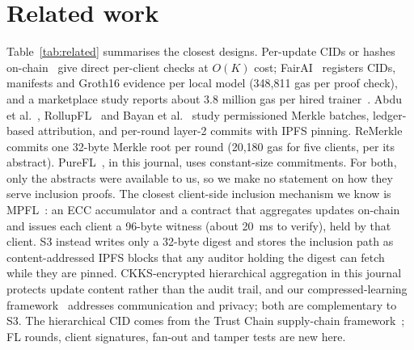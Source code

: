\documentclass[final,3p,times,twocolumn]{elsarticle}
\begin{document}
\section{Related work}\label{sec:related}
Table~\ref{tab:related} summarises the closest designs. Per-update CIDs or hashes on-chain~\cite{rauthan,khor} give direct per-client checks at $O(K)$ cost; FairAI~\cite{fairai} registers CIDs, manifests and Groth16 evidence per local model (348,811 gas per proof check), and a marketplace study reports about 3.8 million gas per hired trainer~\cite{mantegazine}. Abdu et al.~\cite{abdu}, RollupFL~\cite{rollupfl} and Bayan et al.~\cite{bayan} study permissioned Merkle batches, ledger-based attribution, and per-round layer-2 commits with IPFS pinning. ReMerkle~\cite{remerkle} commits one 32-byte Merkle root per round (20,180 gas for five clients, per its abstract). PureFL~\cite{purefl}, in this journal, uses constant-size commitments. For both, only the abstracts were available to us, so we make no statement on how they serve inclusion proofs. The closest client-side inclusion mechanism we know is MPFL~\cite{mazzocca}: an ECC accumulator and a contract that aggregates updates on-chain and issues each client a 96-byte witness (about 20~ms to verify), held by that client. S3 instead writes only a 32-byte digest and stores the inclusion path as content-addressed IPFS blocks that any auditor holding the digest can fetch while they are pinned. CKKS-encrypted hierarchical aggregation in this journal~\cite{dinh2026} protects update content rather than the audit trail, and our compressed-learning framework~\cite{putra2021fcl} addresses communication and privacy; both are complementary to S3. The hierarchical CID comes from the Trust Chain supply-chain framework~\cite{trustchain}; FL rounds, client signatures, fan-out and tamper tests are new here.
\end{document}
